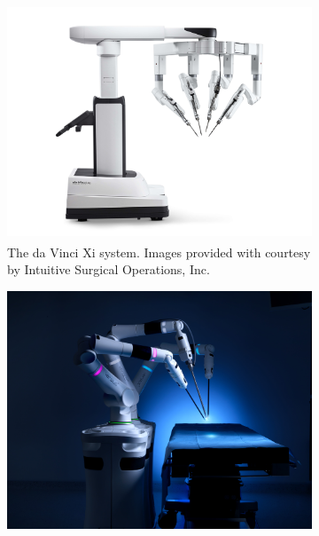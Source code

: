 \begin{figure}
    \centering
    \begin{subfigure}[b]{0.49\textwidth}
        \centering
        \includegraphics[width=\textwidth]{introduction/img/JPG_Large-DV_SYS_Xi_PatientCart_PRF_RGB-min.jpg}
        \caption{The da Vinci\textsuperscript{\textregistered} Xi system. Images provided with courtesy by  Intuitive Surgical Operations, Inc.}
        \label{in:fig:da_vinci}
    \end{subfigure}
    \begin{subfigure}[b]{0.49\textwidth}
        \centering
        \includegraphics[width=\textwidth]{introduction/img/Product-Versius-3-Arm-Setup-B.jpg}

\end{subfigure}
\end{figure}
